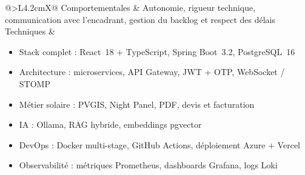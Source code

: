 {\begin{tabularx}{\textwidth}{@{}>{\bfseries\color{ficheblue}}L{4.2cm}X@{}}
\midrule
{}
Comportementales & Autonomie, rigueur technique, communication avec l'encadrant, gestion du backlog et respect des délais \\
Techniques &
\begin{itemize}[leftmargin=1.2em, nosep, topsep=2pt]
\setlength{\itemsep}{1pt}
\item Stack complet : React~18 + TypeScript, Spring Boot~3.2, PostgreSQL~16
\item Architecture : microservices, API Gateway, JWT + OTP, WebSocket / STOMP
\item Métier solaire : PVGIS, Night Panel, PDF, devis et facturation
\item IA : Ollama, RAG hybride, embeddings pgvector
\item DevOps : Docker multi-stage, GitHub Actions, déploiement Azure + Vercel
\item Observabilité : métriques Prometheus, dashboards Grafana, logs Loki
\end{itemize} \\
\bottomrule
\end{tabularx}
}
